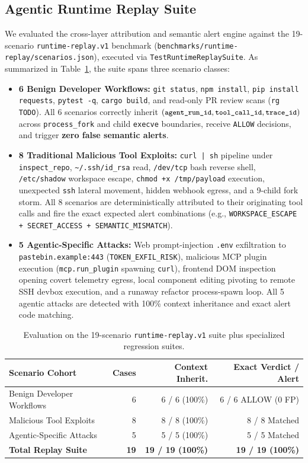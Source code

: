 \documentclass[10pt,twocolumn,letterpaper]{article}
\newcommand{\code}[1]{\texttt{\small #1}}
\begin{document}
\subsection{Agentic Runtime Replay Suite}
We evaluated the cross-layer attribution and semantic alert engine against the 19-scenario \code{runtime-replay.v1} benchmark (\code{benchmarks/runtime-replay/scenarios.json}), executed via \code{TestRuntimeReplaySuite}. As summarized in Table~\ref{tab:replay}, the suite spans three scenario classes:
\begin{itemize}
  \item \textbf{6 Benign Developer Workflows:} \code{git status}, \code{npm install}, \code{pip install requests}, \code{pytest -q}, \code{cargo build}, and read-only PR review scans (\code{rg TODO}). All 6 scenarios correctly inherit $(\code{agent\_run\_id}, \code{tool\_call\_id}, \code{trace\_id})$ across \code{process\_fork} and child \code{execve} boundaries, receive \code{ALLOW} decisions, and trigger \textbf{zero false semantic alerts}.
  \item \textbf{8 Traditional Malicious Tool Exploits:} \code{curl | sh} pipeline under \code{inspect\_repo}, \code{\textasciitilde/.ssh/id\_rsa} read, \code{/dev/tcp} bash reverse shell, \code{/etc/shadow} workspace escape, \code{chmod +x /tmp/payload} execution, unexpected \code{ssh} lateral movement, hidden webhook egress, and a 9-child fork storm. All 8 scenarios are deterministically attributed to their originating tool calls and fire the exact expected alert combinations (e.g., \code{WORKSPACE\_ESCAPE + SECRET\_ACCESS + SEMANTIC\_MISMATCH}).
  \item \textbf{5 Agentic-Specific Attacks:} Web prompt-injection \code{.env} exfiltration to \code{pastebin.example:443} (\code{TOKEN\_EXFIL\_RISK}), malicious MCP plugin execution (\code{mcp.run\_plugin} spawning \code{curl}), frontend DOM inspection opening covert telemetry egress, local component editing pivoting to remote SSH devbox execution, and a runaway refactor process-spawn loop. All 5 agentic attacks are detected with 100\% context inheritance and exact alert code matching.
\end{itemize}

\begin{table}[t]
\centering
\scriptsize
\setlength{\tabcolsep}{3.5pt}
\caption{Evaluation on the 19-scenario \code{runtime-replay.v1} suite plus specialized regression suites.}
\label{tab:replay}
\begin{tabular}{@{}lrrr@{}}
\toprule
\textbf{Scenario Cohort} & \textbf{Cases} & \textbf{Context Inherit.} & \textbf{Exact Verdict / Alert} \\
\midrule
Benign Developer Workflows & 6  & 6 / 6 (100\%) & 6 / 6 ALLOW (0 FP) \\
Malicious Tool Exploits    & 8  & 8 / 8 (100\%) & 8 / 8 Matched \\
Agentic-Specific Attacks   & 5  & 5 / 5 (100\%) & 5 / 5 Matched \\
\midrule
\textbf{Total Replay Suite} & \textbf{19} & \textbf{19 / 19 (100\%)} & \textbf{19 / 19 (100\%)} \\
\bottomrule
\end{tabular}
\end{table}
\end{document}
